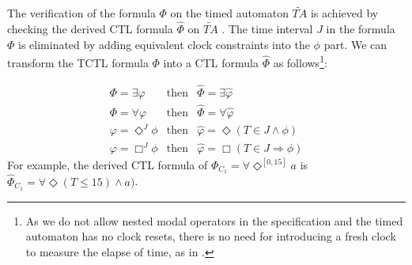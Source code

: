 \documentclass[10pt,conference,compsocconf,letterpaper]{IEEEtran}
\begin{document}
The verification of the formula $\Phi$ on the timed automaton $\widetilde{TA}$ is achieved by checking the derived CTL formula $\hat{\Phi}$ on $\widetilde{TA}$ \cite{Baier08}. The time interval $J$ in the formula $\Phi$ is eliminated by adding equivalent clock constraints into the $\phi$ part. We can transform the TCTL formula $\Phi$ into a CTL formula $\hat{\Phi}$ as follows\footnote{As we do not allow nested modal operators in the specification and the timed automaton has no clock resets, there is no need for introducing a fresh clock to measure the elapse of time, as in \cite{Baier08}.}:
\iffalse
\begin{eqnarray*}
\Phi = \exists \Diamond ^J \phi & \textrm{then} & \hat{\Phi} = \exists \Diamond (T\in J \wedge \phi)\\
\Phi = \forall \Diamond ^J \phi & \textrm{then} & \hat{\Phi} = \forall \Diamond (T\in J \wedge \phi)\\
\Phi = \exists \Box ^J \phi & \textrm{then} & \hat{\Phi} = \exists \Box (T\in J \Rightarrow \phi)\\
\Phi = \exists \Box ^J \phi & \textrm{then} & \hat{\Phi} = \exists \Box (T\in J \Rightarrow \phi)
\end{eqnarray*}
\fi
\begin{eqnarray*}
\Phi = \exists \varphi & \textrm{then} & \hat{\Phi} = \exists \hat{\varphi}\\
\Phi = \forall \varphi & \textrm{then} & \hat{\Phi} = \forall \hat{\varphi}\\
\varphi = \Diamond ^J \phi & \textrm{then} & \hat{\varphi} = \Diamond (T\in J \wedge \phi)\\
\varphi = \Box ^J \phi & \textrm{then} & \hat{\varphi} = \Box (T\in J \Rightarrow \phi)
\end{eqnarray*}
For example, the derived CTL formula of $\Phi_{C_1} = \forall \Diamond^{[0, 15]} a$ is $\hat{\Phi}_{C_1} = \forall \Diamond (T\leq 15) \wedge a)$.
\end{document}
